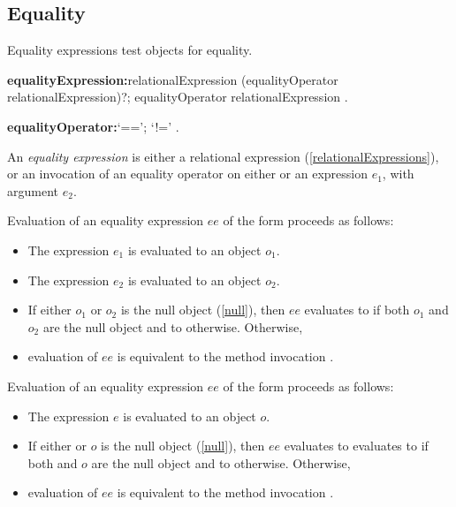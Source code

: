 \documentclass{article}
\begin{document}
\subsection{Equality}

\LMHash{}
Equality expressions test objects for equality.

\begin{grammar}
{\bf equalityExpression:}relationalExpression (equalityOperator relationalExpression)?;
  \SUPER{} equalityOperator relationalExpression
  .

{\bf equalityOperator:}`==';
  `!='
  .
\end{grammar}

\LMHash{}
An {\em equality expression} is either a relational expression (\ref{relationalExpressions}), or an invocation of an equality operator on either \SUPER{} or an expression $e_1$, with argument $e_2$.

\LMHash{}
Evaluation of an equality expression $ee$ of the form  proceeds as follows:
\begin{itemize}
\item The expression $e_1$ is evaluated to an object $o_1$.
\item The expression $e_2$ is evaluated to an object $o_2$.
\item If either $o_1$ or $o_2$ is the null object (\ref{null}), then $ee$ evaluates to \TRUE{} if both $o_1$ and $o_2$ are the null object and to \FALSE{} otherwise.
Otherwise,
\item evaluation of $ee$ is equivalent to the method invocation .
\end{itemize}

\LMHash{}
Evaluation of an equality expression $ee$ of the form  proceeds as follows:
\begin{itemize}
\item The expression $e$ is evaluated to an object $o$.
\item If either \THIS{} or $o$ is the null object (\ref{null}), then $ee$ evaluates to evaluates to \TRUE{} if both \THIS{} and $o$ are the null object and to \FALSE{} otherwise.
Otherwise,
\item evaluation of $ee$ is equivalent to the method invocation .
\end{itemize}

\end{document}
